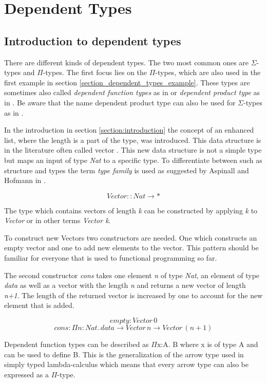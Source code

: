 \section{Dependent Types}
\subsection{Introduction to dependent types}
There are different kinds of dependent types. The two most common ones are $\Sigma$-types and $\Pi$-types.
The first focus lies on the $\Pi$-types, which are also used in the first example in section \ref{section_dependent_types_example}. These types are sometimes also called \emph{dependent function types} as in \cite{10.1145/2841316} or \emph{dependent product type} as in \cite{10.5555/1076265}. Be aware that the name dependent product type can also be used for $\Sigma$-types as in \cite{10.1145/2841316}.

In the introduction in section \ref{section:introduction} the concept of an enhanced list, where the length is a part of the type, was introduced.
This data structure is in the literature often called vector \cite{10.1145/2841316} \cite{10.5555/1076265}.
This new data structure is not a simple type but maps an input of type \emph{Nat} to a specific type. To differentiate between such as structure and types the term \emph{type family} is used as suggested by Aspinall and Hofmann in \cite{10.5555/1076265}.

$$Vector :: Nat \rightarrow *$$

The type which contains vectors of length \emph{k} can be constructed by applying \emph{k} to \emph{Vector} or in other terms \emph{Vector k}.

To construct new Vectors two constructors are needed. 
One which constructs an empty vector and one to add new elements to the vector. 
This pattern should be familiar for everyone that is used to functional programming so far.

The second constructor \emph{cons} takes one element \emph{n} of type \emph{Nat}, an element of type \emph{data} as well as a vector with the length \emph{n} and returns a new vector of length \emph{n+1}. 
The length of the returned vector is increased by one to account for the new element that is added.

$$empty: Vector \, 0$$
$$cons : \Pi n : Nat. \, data \rightarrow Vector \, n \rightarrow Vector \, (n+1)$$

Dependent function types can be described as $\Pi \text{x:A. B}$ where x is of type A and can be used to define B. 
This is the generalization of the arrow type used in simply typed lambda-calculus which means that every arrow type can also be expressed as a $\Pi$-type.

